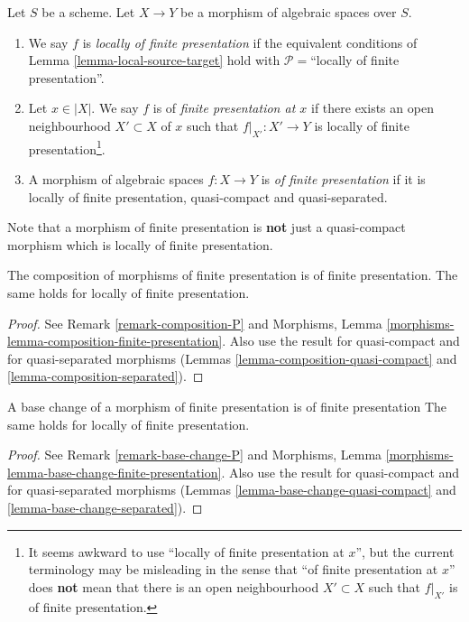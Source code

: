 \begin{definition}
\label{definition-locally-finite-presentation}
Let $S$ be a scheme.
Let $X \to Y$ be a morphism of algebraic spaces over $S$.
\begin{enumerate}
\item We say $f$ is {\it locally of finite presentation} if
the equivalent conditions of
Lemma \ref{lemma-local-source-target}
hold with $\mathcal{P} =$``locally of finite presentation''.
\item Let $x \in |X|$. We say $f$ is of {\it finite presentation at $x$}
if there exists an open neighbourhood $X' \subset X$ of $x$ such
that $f|_{X'} : X' \to Y$ is locally of finite
presentation\footnote{It seems awkward to use ``locally of finite presentation
at $x$'', but the current terminology may be misleading in the sense that
``of finite presentation at $x$'' does {\bf not} mean that there is
an open neighbourhood $X' \subset X$ such that $f|_{X'}$ is of finite
presentation.}.
\item A morphism of algebraic spaces $f : X \to Y$ is
{\it of finite presentation}
if it is locally of finite presentation, quasi-compact and
quasi-separated.
\end{enumerate}
\end{definition}

\noindent
Note that a morphism of finite presentation is {\bf not} just a quasi-compact
morphism which is locally of finite presentation.

\begin{lemma}
\label{lemma-composition-finite-presentation}
The composition of morphisms of finite presentation is of finite presentation.
The same holds for locally of finite presentation.
\end{lemma}

\begin{proof}
See Remark \ref{remark-composition-P} and
Morphisms, Lemma \ref{morphisms-lemma-composition-finite-presentation}.
Also use the result for quasi-compact and for quasi-separated morphisms
(Lemmas \ref{lemma-composition-quasi-compact} and
\ref{lemma-composition-separated}).
\end{proof}

\begin{lemma}
\label{lemma-base-change-finite-presentation}
A base change of a morphism of finite presentation is of finite presentation
The same holds for locally of finite presentation.
\end{lemma}

\begin{proof}
See Remark \ref{remark-base-change-P} and
Morphisms, Lemma \ref{morphisms-lemma-base-change-finite-presentation}.
Also use the result for quasi-compact and for quasi-separated morphisms
(Lemmas \ref{lemma-base-change-quasi-compact} and
\ref{lemma-base-change-separated}).
\end{proof}

